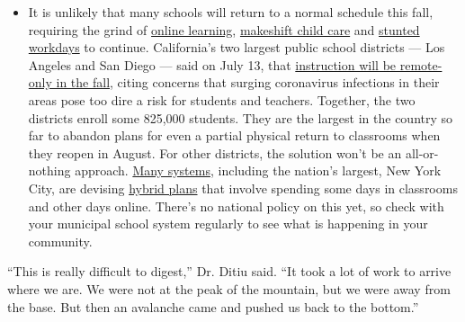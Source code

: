 \begin{itemize}
  \begin{itemize}
  \tightlist
  \item
    It is unlikely that many schools will return to a normal schedule
    this fall, requiring the grind of
    \href{https://www.nytimes3xbfgragh.onion/2020/06/05/us/coronavirus-education-lost-learning.html?action=click\&pgtype=Article\&state=default\&region=MAIN_CONTENT_3\&context=storylines_faq}{online
    learning},
    \href{https://www.nytimes3xbfgragh.onion/2020/05/29/us/coronavirus-child-care-centers.html?action=click\&pgtype=Article\&state=default\&region=MAIN_CONTENT_3\&context=storylines_faq}{makeshift
    child care} and
    \href{https://www.nytimes3xbfgragh.onion/2020/06/03/business/economy/coronavirus-working-women.html?action=click\&pgtype=Article\&state=default\&region=MAIN_CONTENT_3\&context=storylines_faq}{stunted
    workdays} to continue. California's two largest public school
    districts --- Los Angeles and San Diego --- said on July 13, that
    \href{https://www.nytimes3xbfgragh.onion/2020/07/13/us/lausd-san-diego-school-reopening.html?action=click\&pgtype=Article\&state=default\&region=MAIN_CONTENT_3\&context=storylines_faq}{instruction
    will be remote-only in the fall}, citing concerns that surging
    coronavirus infections in their areas pose too dire a risk for
    students and teachers. Together, the two districts enroll some
    825,000 students. They are the largest in the country so far to
    abandon plans for even a partial physical return to classrooms when
    they reopen in August. For other districts, the solution won't be an
    all-or-nothing approach.
    \href{https://bioethics.jhu.edu/research-and-outreach/projects/eschool-initiative/school-policy-tracker/}{Many
    systems}, including the nation's largest, New York City, are
    devising
    \href{https://www.nytimes3xbfgragh.onion/2020/06/26/us/coronavirus-schools-reopen-fall.html?action=click\&pgtype=Article\&state=default\&region=MAIN_CONTENT_3\&context=storylines_faq}{hybrid
    plans} that involve spending some days in classrooms and other days
    online. There's no national policy on this yet, so check with your
    municipal school system regularly to see what is happening in your
    community.
  \end{itemize}
\end{itemize}

``This is really difficult to digest,'' Dr. Ditiu said. ``It took a lot
of work to arrive where we are. We were not at the peak of the mountain,
but we were away from the base. But then an avalanche came and pushed us
back to the bottom.''

